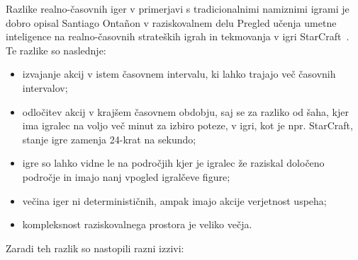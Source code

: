 \documentclass[a4paper, 12pt]{book}
\begin{document}
Razlike realno-časovnih iger v primerjavi s tradicionalnimi namiznimi igrami je dobro opisal Santiago Ontañon v raziskovalnem delu Pregled učenja umetne inteligence na realno-časovnih strateških igrah in tekmovanja v igri StarCraft~\cite{survey_real_time_strategy_ai_research_starcraft}.
Te razlike so naslednje:
\begin{itemize}
	\item izvajanje akcij v istem časovnem intervalu, ki lahko trajajo več časovnih intervalov;
	\item odločitev akcij v krajšem časovnem obdobju, saj se za razliko od šaha, kjer ima igralec na voljo več minut za izbiro poteze, v igri, kot je npr. StarCraft, stanje igre zamenja 24-krat na sekundo;
	\item igre so lahko vidne le na področjih kjer je igralec že raziskal določeno področje in imajo nanj vpogled igralčeve figure;
	\item večina iger ni determinističnih, ampak imajo akcije verjetnost uspeha;
	\item kompleksnost raziskovalnega prostora je veliko večja.
\end{itemize}
\noindent
Zaradi teh razlik so nastopili razni izzivi:
\end{document}
